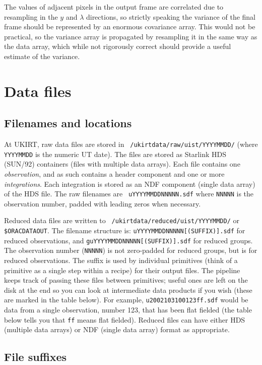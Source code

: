 \documentclass[twoside,11pt]{article}
\renewcommand{\_}{\texttt{\symbol{95}}}
\begin{document}
The values of adjacent pixels in the output frame are correlated due
to resampling in the $y$ and $\lambda$ directions, so strictly
speaking the variance of the final frame should be represented by an
enormous covariance array. This would not be practical, so the
variance array is propagated by resampling it in the same way as the
data array, which while not rigorously correct should provide a
useful estimate of the variance.


\section{Data files}

\subsection{Filenames and locations}

At UKIRT, raw data files are stored in {\tt
  /ukirtdata/raw/uist/YYYYMMDD/} (where {\tt YYYYMMDD} is the numeric
UT date).  The files are stored as Starlink HDS (SUN/92) containers (files
with multiple data arrays). Each file contains one \emph{observation},
and as such contains a header component and one or more
\emph{integrations}.  Each integration is stored as an NDF component
(single data array) of the HDS file. The raw filenames are {\tt
  uYYYYMMDD\_NNNNN.sdf} where {\tt NNNNN} is the observation number,
padded with leading zeros when necessary.

Reduced data files are written to {\tt
  /ukirtdata/reduced/uist/YYYYMMDD/} or {\tt \$ORAC\_DATA\_OUT}.  The
filename structure is: {\tt uYYYYMMDD\_NNNNN[\_(SUFFIX)].sdf} for reduced
observations, and {\tt guYYYYMMDD\_NNNNN[\_(SUFFIX)].sdf} for reduced
groups. The observation number ({\tt NNNNN}) is not zero-padded for
reduced groups, but is for reduced observations.
The suffix is used by individual primitives (think of a primitive as
a single step within a recipe) for their output files. The pipeline
keeps track of passing these files between primitives; useful ones are
left on the disk at the end so you can look at intermediate data
products if you wish (these are marked in the table below).
For example, {\tt u20021031\_00123\_ff.sdf} would be data from a single
observation, number 123, that has been flat fielded (the table below
tells you that {\tt \_ff} means flat fielded). Reduced files can have either
HDS (multiple data arrays) or NDF (single data array) format as
appropriate.

\subsection{File suffixes}
\end{document}
